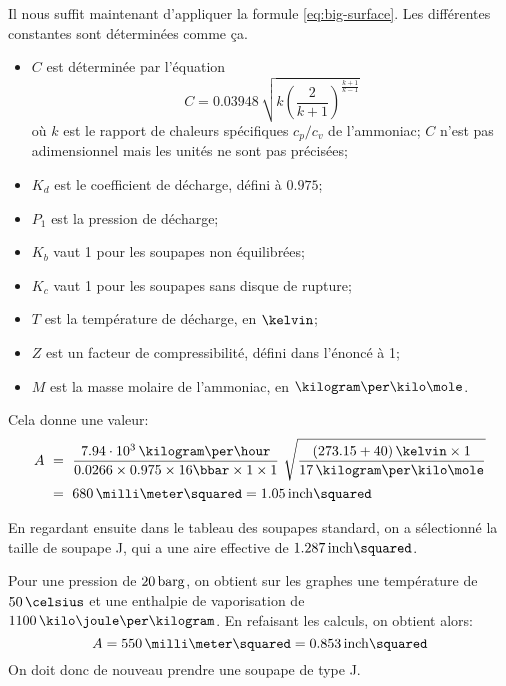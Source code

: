 Il nous suffit maintenant d'appliquer la formule \eqref{eq:big-surface}.
Les différentes constantes sont déterminées comme ça.
\begin{itemize}
    \item $C$ est déterminée par l'équation
        \begin{equation}
            C = 0.03948\,\sqrt{k\left(\frac{2}{k+1}\right)^\frac{k+1}{k-1}}
        \end{equation}
        où $k$ est le rapport de chaleurs spécifiques $c_p/c_v$ de l'ammoniac;
        $C$ n'est pas adimensionnel mais les unités ne sont pas précisées;
    \item $K_d$ est le coefficient de décharge, défini à $0.975$;
    \item $P_1$ est la pression de décharge;
    \item $K_b$ vaut 1 pour les soupapes non équilibrées;
    \item $K_c$ vaut 1 pour les soupapes sans disque de rupture;
    \item $T$ est la température de décharge, en $\kelvin$;
    \item $Z$ est un facteur de compressibilité, défini dans l'énoncé à 1;
    \item $M$ est la masse molaire de l'ammoniac, en $\kilogram\per\kilo\mole$.
\end{itemize}
Cela donne une valeur:
\begin{equation*}
    \begin{aligned}
        A\ &=\ \frac{7.94\cdot10^3\,\kilogram\per\hour}
        {0.0266 \times 0.975 \times 16\bbar \times 1 \times 1}\ 
        \sqrt{\frac{(273.15+40)\,\kelvin \times 1}{17\,\kilogram\per\kilo\mole}}
        \\
        &=\ 680\,\milli\meter\squared = 1.05\,\inch\squared
    \end{aligned}
\end{equation*}

En regardant ensuite dans le tableau des soupapes standard,
on a sélectionné la taille de soupape J, qui a une aire
effective de $1.287\,\inch\squared$.

Pour une pression de $20\,\mathrm{barg}$, on obtient sur
les graphes une température de $50\,\celsius$
et une enthalpie de vaporisation de $1100\,\kilo\joule\per\kilogram$.
En refaisant les calculs, on obtient alors:
\begin{equation*}
    A = 550\,\milli\meter\squared = 0.853\,\inch\squared
\end{equation*}
On doit donc de nouveau prendre une soupape de type J.

